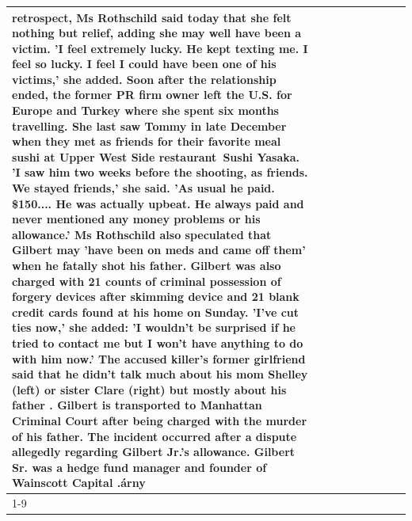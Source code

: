 \begin{table}[H]
\begin{tabular}{lllrlllll}
retrospect, Ms Rothschild said today that she felt nothing but relief, adding she may well have been a victim. 'I feel extremely lucky. He kept texting me. I feel so lucky. I feel I could have been one of his victims,' she added. Soon after the relationship ended, the former PR firm owner left the U.S. for Europe and Turkey where she spent six months  travelling. She last saw Tommy in late December when they met as friends for their favorite meal sushi at Upper West Side restaurant Sushi Yasaka. 'I saw him two weeks before the shooting, as friends. We stayed friends,' she said. 'As usual he paid. \$150.... He was actually upbeat. He always paid and never mentioned any money problems or his allowance.' Ms Rothschild also speculated that Gilbert may 'have been on meds and came off them' when he fatally shot his father. Gilbert was also charged with 21 counts of criminal possession of forgery devices after skimming device and 21 blank credit cards found at his home on Sunday. 'I've cut ties now,' she added: 'I wouldn’t be surprised if he tried to contact me but I won’t have anything to do with him now.' The accused killer's former girlfriend said that he didn't talk much about his mom Shelley (left) or sister Clare (right) but mostly about his father . Gilbert is transported to Manhattan Criminal Court  after being charged with the murder of his father. The incident occurred after a dispute allegedly regarding Gilbert Jr.'s allowance. Gilbert Sr. was a hedge fund manager and founder of Wainscott Capital .árny \\
\cline{1-9}

\end{tabular}
\end{table}
